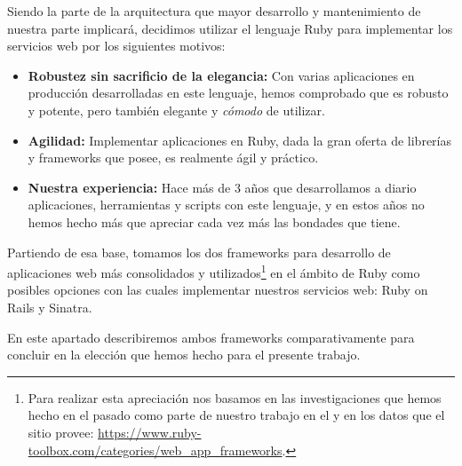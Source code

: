 Siendo la parte de la arquitectura que mayor desarrollo y mantenimiento de nuestra parte implicará, decidimos utilizar el lenguaje Ruby para implementar los servicios web por los siguientes motivos:

\begin{itemize}
  \item \textbf{Robustez sin sacrificio de la elegancia:} Con varias aplicaciones en producción desarrolladas en este lenguaje, hemos comprobado que es robusto y potente, pero también elegante y \textit{cómodo} de utilizar.
  \item \textbf{Agilidad:} Implementar aplicaciones en Ruby, dada la gran oferta de librerías y frameworks que posee, es realmente ágil y práctico.
  \item \textbf{Nuestra experiencia:} Hace más de 3 años que desarrollamos a diario aplicaciones, herramientas y scripts con este lenguaje, y en estos años no hemos hecho más que apreciar cada vez más las bondades que tiene.
\end{itemize}

Partiendo de esa base, tomamos los dos frameworks para desarrollo de aplicaciones web más consolidados y utilizados\footnote{Para realizar esta apreciación nos basamos en las investigaciones que hemos hecho en el pasado como parte de nuestro trabajo en el {\cespi} y en los datos que el sitio  provee: \url{https://www.ruby-toolbox.com/categories/web_app_frameworks}.} en el ámbito de Ruby como posibles opciones con las cuales implementar nuestros servicios web: Ruby on Rails y Sinatra.

En este apartado describiremos ambos frameworks comparativamente para concluir en la elección que hemos hecho para el presente trabajo.
